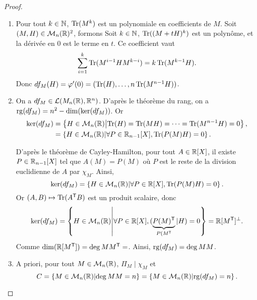 \documentclass[12pt]{article}
\begin{document}
\begin{proof}
	\phantom{}
	\begin{enumerate}
		\item Pour tout $k\in\mathbb{N}$, $\operatorname{Tr}(M^{k})$ est un polynomiale en coefficients de $M$. Soit $(M,H)\in\mathcal{M}_n(\mathbb{R})^{2}$, formons 
		Soit $k\in\mathbb{N}$, $\operatorname{Tr}((M+tH)^{k})$ est un polynôme, et la dérivée en 0 est le terme en $t$. Ce coefficient vaut 
		\begin{equation}
			\sum_{i=1}^{k}\operatorname{Tr}(M^{i-1}HM^{k-i})=k\operatorname{Tr}(M^{k-1}H).
		\end{equation}
		Donc $df_{M}(H)=\varphi'(0)=(\operatorname{Tr}(H),\dots,n\operatorname{Tr}(M^{n-1}H))$.

		\item On a $df_{M}\in\mathcal{L}(M_n(\mathbb{R}),\mathbb{R}^{n})$. D'après le théorème du rang, on a $\operatorname{rg}(df_{M})=n^{2}-\dim(\ker(df_{M}))$. Or 
		\begin{align}
			\ker(df_{M})
			&=\left\lbrace H\in\mathcal{M}_n(\mathbb{R})\middle| \operatorname{Tr}(H)=\operatorname{Tr}(MH)=\dots=\operatorname{Tr}(M^{n-1}H)=0\right\rbrace,\\
			&=\left\lbrace H\in\mathcal{M}_n(\mathbb{R})\middle| \forall P\in\mathbb{R}_{n-1}[X],\operatorname{Tr}(P(M)H)=0\right\rbrace.
		\end{align}

		D'après le théorème de Cayley-Hamilton, pour tout $A\in\mathbb{R}[X]$, il existe $P\in\mathbb{R}_{n-1}[X]$ tel que $A(M)=P(M)$ où $P$ est le reste de la division euclidienne de $A$ par $\chi_{M}$. Ainsi, 
		\begin{equation}
			\ker(df_{M})=\left\lbrace H\in\mathcal{M}_n(\mathbb{R})\middle|\forall P\in\mathbb{R}[X],\operatorname{Tr}(P(M)H)=0\right\rbrace.
		\end{equation}
		Or $(A,B)\mapsto\operatorname{Tr}(A^{\mathsf{T}}B)$ est un produit scalaire, donc 
		\begin{equation}
			\ker(df_{M})=\left\lbrace H\in\mathcal{M}_n(\mathbb{R})\middle|\forall P\in\mathbb{R}[X],(\underbrace{P(M)^{\mathsf{T}}}_{P(M^{\mathsf{T}}}|H)=0\right\rbrace=\mathbb{R}[M^{\mathsf{T}}]^{\perp}.
		\end{equation}
		Comme $\dim(\R[M^{\mathsf{T}}])=\deg\Pi_{M^{\mathsf{T}}}=\def\Pi_{M}$. Ainsi, $\rg(df_{M})=\deg\Pi_{M}$.

		\item A priori, pour tout $M\in\mathcal{M}_n(\mathbb{R})$, $\Pi_M\mid \chi_M$ et 
		\begin{equation}
			C=\left\lbrace M\in\mathcal{M}_n(\R)\middle|\deg\Pi_M=n\right\rbrace=\left\lbrace M\in\mathcal{M}_n(\R)\middle|\rg(df_M)=n\right\rbrace.
		\end{equation}


\end{enumerate}
\end{proof}
\end{document}
